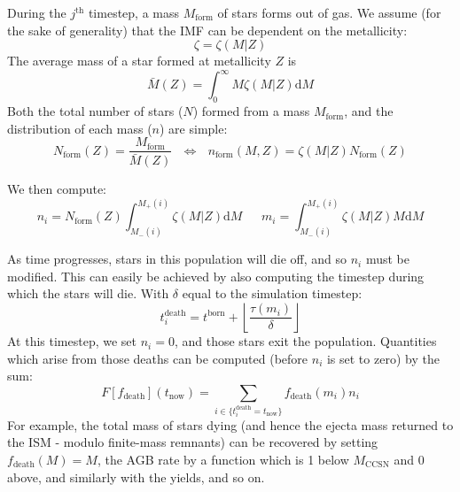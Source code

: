 \documentclass[a4paper,11pt]{article}
\def\d{\mathrm d}
\begin{document}
		During the $j^\text{th}$ timestep, a mass $M_\text{form}$ of stars forms out of gas. We assume (for the sake of generality) that the IMF can be dependent on the metallicity:
		\begin{equation}
			\zeta = \zeta(M|Z)
		\end{equation}
		The average mass of a star formed at metallicity $Z$ is
		\begin{equation}
			\bar{M}(Z) = \int_0^\infty M \zeta(M|Z) \mathrm d M
		\end{equation}
		Both the total number of stars ($N$) formed from a mass $M_\text{form}$, and the distribution of each mass ($n$) are simple:
		\begin{equation}
			N_\text{form}(Z) = \frac{M_\text{form}}{\bar{M}(Z)} ~~~ \Longleftrightarrow~~~n_\text{form}(M,Z) = \zeta(M|Z) N_\text{form}(Z)
		\end{equation}

		We then compute:
		\begin{equation}
			n_i = N_\text{form}(Z) \int_{M_-(i)}^{M_+(i)}\zeta(M|Z) \d M ~~~~~~~ m_i = \int_{M_-(i)}^{M_+(i)}\zeta(M|Z) M \d M 
		\end{equation}

		As time progresses, stars in this population will die off, and so $n_i$ must be modified. This can easily be achieved by also computing the timestep during which the stars will die. With $\delta$ equal to the simulation timestep:
		\begin{equation}
			t_i^\text{death} = t^\text{born} + \left\lfloor\frac{\tau(m_i)}{\delta} \right\rfloor
		\end{equation}
		At this timestep, we set $n_i = 0$, and those stars exit the population. Quantities which arise from those deaths can be computed (before $n_i$ is set to zero) by the sum:
		\begin{equation}
			F[f_\text{death}](t_\text{now}) = \sum_{i \in \{t_i^\text{death} = t_\text{now}\}} f_{\text{death}}(m_i) n_i \label{E:DeathBins}
		\end{equation} 
		For example, the total mass of stars dying (and hence the ejecta mass returned to the ISM - modulo finite-mass remnants) can be recovered by setting $f_\text{death}(M) = M$, the AGB rate by a function which is 1 below $M_\text{CCSN}$ and 0 above, and similarly with the yields, and so on.
\end{document}

